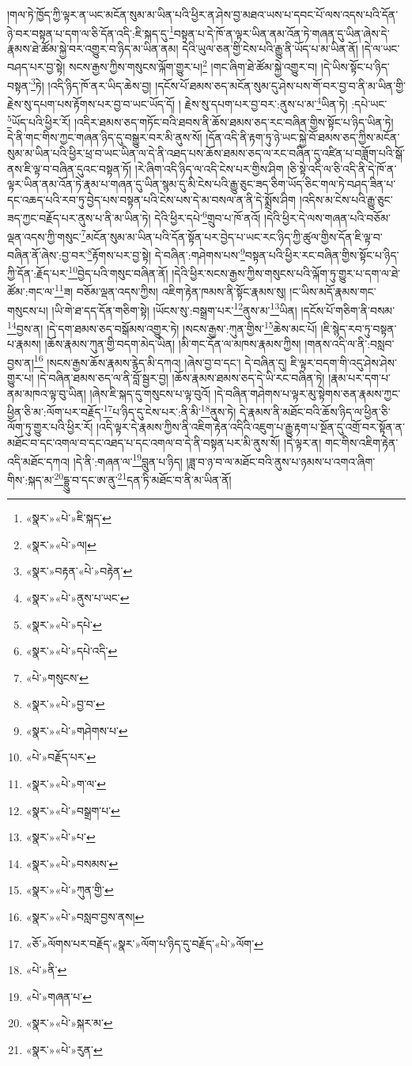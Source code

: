།གལ་ཏེ་ཁྱོད་ཀྱི་ལྟར་ན་ཡང་མངོན་སུམ་མ་ཡིན་པའི་ཕྱིར་ན་ཤེས་བྱ་མཐའ་ཡས་པ་དབང་པོ་ལས་འདས་པའི་དོན་ཉེ་བར་བསྟན་པ་དག་ལ་ཅི་དོན་འདི་:ཇི་སྐད་དུ་\footnote{«སྣར་»«པེ་»ཇི་སྐད་}བསྟན་པ་དེ་ཁོ་ན་ལྟར་ཡིན་ནམ་འོན་ཏེ་གཞན་དུ་ཡིན་ཞེས་དེ་རྣམས་ཐེ་ཚོམ་སྐྱེ་བར་འགྱུར་བ་ཉིད་མ་ཡིན་ནམ། དེའི་ཡུལ་ཅན་གྱི་ངེས་པའི་རྒྱུ་ནི་ཡོད་པ་མ་ཡིན་ནོ། །དེ་ལ་ཡང་བཤད་པར་བྱ་སྟེ། སངས་རྒྱས་ཀྱིས་གསུངས་ལྐོག་གྱུར་པ།\footnote{«སྣར་»«པེ་»ལ།} །གང་ཞིག་ཐེ་ཚོམ་སྐྱེ་འགྱུར་བ། །དེ་ཡིས་སྟོང་པ་ཉིད་བསྟན་\footnote{«སྣར་»བརྟན་«པེ་»བརྟེན་}ཏེ། །འདི་ཉིད་ཁོ་ནར་ཡིད་ཆེས་བྱ། །དངོས་པོ་ཐམས་ཅད་མངོན་སུམ་དུ་ཤེས་པས་གོ་བར་བྱ་བ་ནི་མ་ཡིན་གྱི་རྗེས་སུ་དཔག་པས་རྟོགས་པར་བྱ་བ་ཡང་ཡོད་དོ། །
རྗེས་སུ་དཔག་པར་བྱ་བར་:ནུས་པ་མ་\footnote{«སྣར་»«པེ་»ནུས་པ་ཡང་}ཡིན་ཏེ། :དཔེ་ཡང་\footnote{«སྣར་»«པེ་»དཔེ་}ཡོད་པའི་ཕྱིར་རོ། །འདིར་ཐམས་ཅད་གཏོང་བའི་ཐབས་ནི་ཆོས་ཐམས་ཅད་རང་བཞིན་གྱིས་སྟོང་པ་ཉིད་ཡིན་ཏེ། དེ་ནི་གང་གིས་ཀྱང་གཞན་ཉིད་དུ་བསྒྱུར་བར་མི་ནུས་སོ། །དོན་འདི་ནི་རྟག་ཏུ་ཉེ་ཡང་སྐྱེ་བོ་ཐམས་ཅད་ཀྱིས་མངོན་སུམ་མ་ཡིན་པའི་ཕྱིར་ཕྲ་བ་ཡང་ཡིན་ལ་དེ་ནི་འཐད་པས་ཆོས་ཐམས་ཅད་ལ་རང་བཞིན་དུ་འཛིན་པ་བཟློག་པའི་སྒོ་ནས་ཇི་ལྟ་བ་བཞིན་དུའང་བསྟན་ཏོ། །རེ་ཞིག་འདི་ཉིད་ལ་འདི་ངེས་པར་གྱིས་ཤིག །ཅི་སྟེ་འདི་ལ་ཅི་འདི་ནི་དེ་ཁོ་ན་ལྟར་ཡིན་ནམ་འོན་ཏེ་རྣམ་པ་གཞན་དུ་ཡིན་སྙམ་དུ་མི་ངེས་པའི་རྒྱུ་ཅུང་ཟད་ཅིག་ཡོད་ཅིང་གལ་ཏེ་བཤད་ཟིན་པ་དང་འཆད་པའི་རབ་ཏུ་བྱེད་པས་བསྟན་པའི་ངེས་པས་དེ་མ་བསལ་ན་ནི་དེ་སྨྲོས་ཤིག །འདིས་མ་ངེས་པའི་རྒྱུ་ཅུང་ཟད་ཀྱང་བརྗོད་པར་ནུས་པ་ནི་མ་ཡིན་ཏེ། དེའི་ཕྱིར་དཔེ་\footnote{«སྣར་»«པེ་»དཔེ་འདི་}གྲུབ་པ་ཁོ་ནའོ། །དེའི་ཕྱིར་དེ་ལས་གཞན་པའི་བཅོམ་ལྡན་འདས་ཀྱི་གསུང་\footnote{«པེ་»གསུངས་}མངོན་སུམ་མ་ཡིན་པའི་དོན་སྟོན་པར་བྱེད་པ་ཡང་རང་ཉིད་ཀྱི་ཚུལ་གྱིས་དོན་ཇི་ལྟ་བ་བཞིན་ནོ་ཞེས་:བྱ་བར་\footnote{«སྣར་»«པེ་»བྱ་བ་}རྟོགས་པར་བྱ་སྟེ། དེ་བཞིན་:གཤེགས་པས་\footnote{«སྣར་»«པེ་»གཤེགས་པ་}བསྟན་པའི་ཕྱིར་རང་བཞིན་གྱིས་སྟོང་པ་ཉིད་ཀྱི་དོན་:རྗོད་པར་\footnote{«པེ་»བརྗོད་པར་}བྱེད་པའི་གསུང་བཞིན་ནོ། །དེའི་ཕྱིར་སངས་རྒྱས་ཀྱིས་གསུངས་པའི་ལྐོག་ཏུ་གྱུར་པ་དག་ལ་ཐེ་ཚོམ་:གང་ལ་\footnote{«སྣར་»«པེ་»ག་ལ་}ཟ། བཅོམ་ལྡན་འདས་ཀྱིས། འཇིག་རྟེན་ཁམས་ནི་སྟོང་རྣམས་སུ། །ང་ཡིས་མདོ་རྣམས་གང་གསུངས་པ། །ཡི་གེ་ཐ་དད་དོན་གཅིག་སྟེ། །ཡོངས་སུ་:བསྒྲག་པར་\footnote{«སྣར་»«པེ་»བསྒྲག་པ་}ནུས་མ་\footnote{«སྣར་»«པེ་»པ་}ཡིན། །དངོས་པོ་གཅིག་ནི་བསམ་\footnote{«སྣར་»«པེ་»བསམས་}བྱས་ན། །དེ་དག་ཐམས་ཅད་བསྒོམས་འགྱུར་ཏེ། །སངས་རྒྱས་:ཀུན་གྱིས་\footnote{«སྣར་»«པེ་»ཀུན་གྱི་}ཆེས་མང་པོ། །ཇི་སྙེད་རབ་ཏུ་བསྟན་པ་རྣམས། །ཆོས་རྣམས་ཀུན་གྱི་བདག་མེད་ཡིན། །མི་གང་དོན་ལ་མཁས་རྣམས་ཀྱིས། །གནས་འདི་ལ་ནི་:བསླབ་བྱས་ན།\footnote{«སྣར་»«པེ་»བསླབ་བྱས་ནས།} །སངས་རྒྱས་ཆོས་རྣམས་རྙེད་མི་དཀའ། །ཞེས་བྱ་བ་དང་། དེ་བཞིན་དུ། ཇི་ལྟར་བདག་གི་འདུ་ཤེས་ཤེས་གྱུར་པ། །དེ་བཞིན་ཐམས་ཅད་ལ་ནི་བློ་སྦྱར་བྱ། །ཆོས་རྣམས་ཐམས་ཅད་དེ་ཡི་རང་བཞིན་ཏེ། །རྣམ་པར་དག་པ་ནམ་མཁའ་ལྟ་བུ་ཡིན། །ཞེས་ཇི་སྐད་དུ་གསུངས་པ་ལྟ་བུའོ། །དེ་བཞིན་གཤེགས་པ་ལྟར་མུ་སྟེགས་ཅན་རྣམས་ཀྱང་ཕྱིན་ཅི་མ་:ལོག་པར་བརྗོད་\footnote{«ཅོ་»ལོགས་པར་བརྗོད་«སྣར་»ལོག་པ་ཉིད་དུ་བརྗོད་«པེ་»ལོག་}པ་ཉིད་དུ་ངེས་པར་:ནི་མི་\footnote{«པེ་»ནི་}ནུས་ཏེ། དེ་རྣམས་ནི་མཐོང་བའི་ཆོས་ཉིད་ལ་ཕྱིན་ཅི་ལོག་ཏུ་གྱུར་པའི་ཕྱིར་རོ། །འདི་ལྟར་དེ་རྣམས་ཀྱིས་ནི་འཇིག་རྟེན་འདིའི་འཇུག་པ་རྒྱུ་རྟག་པ་སྔོན་དུ་འགྲོ་བར་སྟོན་ན་མཐོང་བ་དང་འགལ་བ་དང་འཐད་པ་དང་འགལ་བ་དེ་ནི་བསྟན་པར་མི་ནུས་སོ། །དེ་ལྟར་ན། གང་གིས་འཇིག་རྟེན་འདི་མཐོང་དཀའ། །དེ་ནི་:གཞན་ལ་\footnote{«པེ་»གཞན་པ་}བླུན་པ་ཉིད། །ཟླ་བ་ཉ་བ་ལ་མཐོང་བའི་ནུས་པ་ཉམས་པ་འགའ་ཞིག་གིས་:སྐད་མ་\footnote{«སྣར་»«པེ་»སྐར་མ་}དྷྲུུ་བ་དང་ཨ་ནུ་\footnote{«སྣར་»«པེ་»རུན་}དན་ཏི་མཐོང་བ་ནི་མ་ཡིན་ནོ། 